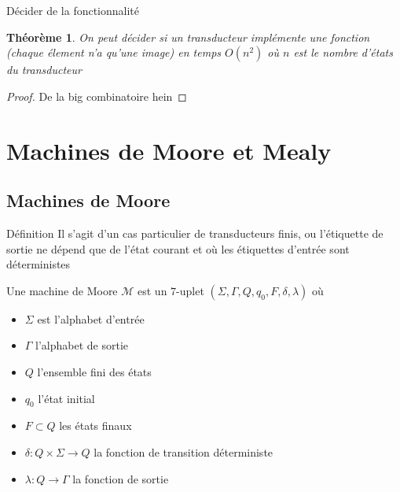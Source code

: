 \documentclass{beamer}
\newtheorem{thm}{Théorème}
\begin{document}
\begin{frame}{Décider de la fonctionnalité}
    \begin{thm}
        On peut décider si un transducteur implémente une fonction (chaque élement n'a qu'une image) en temps $O(n^2)$ où
        $n$ est le nombre d'états du transducteur
    \end{thm}
    \begin{proof}
        De la big combinatoire hein
    \end{proof}
\end{frame}

\section{Machines de Moore et Mealy}

\subsection{Machines de Moore}

\begin{frame}{Définition}
    Il s'agit d'un cas particulier de transducteurs finis, ou l'étiquette de sortie ne dépend que de l'état
    courant et où les étiquettes d'entrée sont déterministes
    \begin{definition}
        Une machine de Moore $\mathcal{M}$ est un $7$-uplet $(\Sigma, \Gamma, Q, q_0, F, \delta, \lambda)$ où
        \begin{itemize}
            \item $\Sigma$ est l'alphabet d'entrée
            \item $\Gamma$ l'alphabet de sortie
            \item $Q$ l'ensemble fini des états
            \item $q_0$ l'état initial
            \item $F \subset Q$ les états finaux
            \item $\delta : Q \times \Sigma \rightarrow Q$ la fonction de transition déterministe
            \item $\lambda : Q \rightarrow \Gamma$ la fonction de sortie
        \end{itemize}
    \end{definition}
\end{frame}
\end{document}

